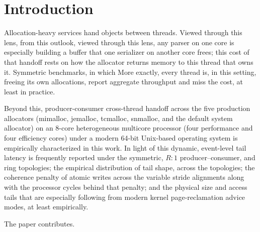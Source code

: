 \section{Introduction}
\label{sec:intro}
Allocation-heavy services hand objects between threads. Viewed through this lens, from this outlook, viewed through this lens, any parser on one core is especially building a
buffer that one serializer on another core frees; this cost of that handoff rests on
how the allocator returns memory to this thread that owns it. Symmetric benchmarks, in which
More exactly, every thread is, in this setting, freeing its own allocations, report aggregate throughput and miss the cost, at least in practice.

Beyond this, producer-consumer cross-thread handoff across the five production allocators (mimalloc, jemalloc, tcmalloc, snmalloc, and the default system allocator) on an 8-core heterogeneous multicore processor (four performance and four efficiency cores) under a modern 64-bit Unix-based operating system is empirically characterized in this work. In light of this dynamic, event-level tail latency is frequently reported under the symmetric, $R\!:\!1$ producer--consumer, and ring topologies; the empirical distribution of tail shape, across the topologies; the coherence penalty of atomic writes across the variable stride alignments along with the processor cycles behind that penalty; and the physical size and access tails that are especially following from modern kernel page-reclamation advice modes, at least empirically.

The paper contributes.

